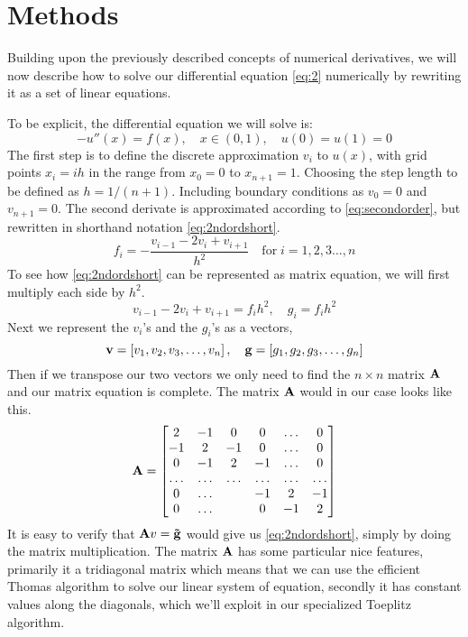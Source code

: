 \section*{Methods}
Building upon the previously described concepts of numerical derivatives, we will now describe how to solve our differential
equation \cref{eq:2}  numerically by rewriting it as a set of linear equations.
\par
To be explicit, the differential equation we will solve is:
\begin{equation*}
  -u''(x) = f(x), \quad x \in (0,1), \quad u(0)=u(1)=0
\end{equation*}
The first step is to define the discrete approximation $v_i$ to $u(x)$, with
grid points
$x_i = ih$ in the range from $x_0 = 0$ to $x_{n +1} = 1$. Choosing the step
length to be defined as $h = 1/(n+1)$. Including boundary conditions as $v_0 =
0$ and $v_{n+1} = 0$. The second derivate is approximated according to
\cref{eq:secondorder}, but rewritten in shorthand notation \cref{eq:2ndordshort}.
\begin{equation}\label{eq:2ndordshort}
  f_i = -\frac{v_{i-1}-2v_i + v_{i+1}}{h^2} \quad \mathrm{for} \; i = 1,2,3 \dots , n
\end{equation}
To see how \cref{eq:2ndordshort} can be represented as matrix equation, we will
first multiply each side by $h^2$.
\begin{equation*}
  v_{i-1} -2v_{i} + v_{i+1} = f_i h^2, \quad  g_i = f_i h^2
\end{equation*}
Next we represent the $v_i$'s and the $g_i$'s as a vectors,
\begin{equation*}
  \mathbf{v} = \left[v_1, v_2, v_3 ,\dots, v_{n}\right], \quad
  \mathbf{g} = \left[g_1, g_2, g_3,
  \dots, g_{n} \right]
\end{equation*}
Then if we transpose our two vectors we only need to find the $n\times n$ matrix
$\mathbf{A}$ and our matrix equation is complete. The matrix $\mathbf{A}$ would in
our case looks like this.
\begin{equation*}
  \mathbf{A} =
  \begin{bmatrix}
    2 & -1 & 0 & 0 &\dots & 0 \\
    -1 & 2 & -1 & 0 & \dots & 0 \\
     0 & -1 & 2 & -1 & \dots & 0  \\
     \dots & \dots & \dots & \dots & \dots & \dots \\
     0 & \dots & & -1 & 2 & -1 \\
     0 & \dots & & 0 & -1 & 2
  \end{bmatrix}
\end{equation*}
It is easy to verify that $\mathbf{A} v = \mathbf{\tilde{g}}$ would give us
\cref{eq:2ndordshort}, simply by doing the matrix multiplication. The matrix $\mathbf{A}$ has some
particular nice features, primarily it a tridiagonal matrix which means that we
can use the efficient Thomas algorithm to solve our linear system of equation,
secondly it has constant values along the diagonals, which we'll exploit in our
specialized Toeplitz algorithm.
